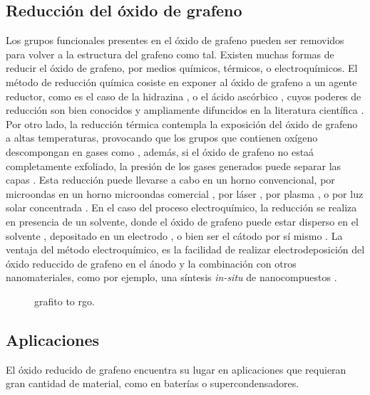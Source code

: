 \subsection{Reducción del óxido de grafeno}
Los grupos funcionales presentes en el óxido de grafeno pueden ser removidos para volver a la estructura del grafeno como tal.
Existen muchas formas de reducir el óxido de grafeno, por medios químicos, térmicos, o electroquímicos. El método de reducción química cosiste en exponer al óxido de grafeno a un agente reductor, como es el caso de la hidrazina , o el ácido ascórbico \citep{Fernandez-Merino2010}, cuyos poderes de reducción son bien conocidos y ampliamente difuncidos en la literatura científica \citep{Chua2015}. Por otro lado, la reducción térmica contempla la exposición del óxido de grafeno a altas temperaturas, provocando que los grupos que contienen oxígeno descompongan en gases como , además, si el óxido de grafeno no estaá completamente exfoliado, la presión de los gases generados puede separar las capas \citep{Pei2012}. Esta reducción puede llevarse a cabo en un horno convencional, por microondas en un horno microondas comercial \citep{Zhu2010a}, por láser \citep{El-Kady2013}, por plasma \citep{Lee2012}, o por luz solar concentrada \citep{Mohandoss2017}. En el caso del proceso electroquímico, la reducción se realiza en presencia de un solvente, donde el óxido de grafeno puede estar disperso en el solvente \citep{Liu2011}, depositado en un electrodo \citep{Harima2011, Toh2014}, o bien ser el cátodo por sí mismo \citep{Feng2016}. La ventaja del método electroquímico, es la facilidad de realizar electrodeposición del óxido reduccido de grafeno en el ánodo y la combinación con otros nanomateriales, como por ejemplo, una síntesis \emph{in-situ} de nanocompuestos \citep{Liu2011, Xie2014}.


\begin{figure}
	\centering
	\caption{grafito to rgo.}
	\label{fig:graphiteToRGO}
\end{figure}

\subsection{Aplicaciones}
El óxido reducido de grafeno encuentra su lugar en aplicaciones que requieran gran cantidad de material, como en baterías o supercondensadores.




